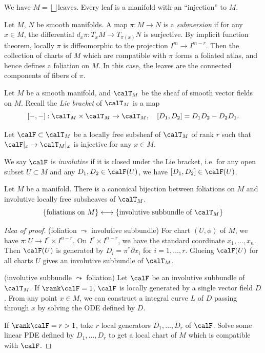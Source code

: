 \begin{remark}
  We have
  $M = \bigsqcup \text{leaves}$.
  Every leaf is a manifold with an ``injection'' to $M$.
\end{remark}

\begin{example}
  Let $M$, $N$ be smooth manifolds.
  A map $\pi : M \to N$ is a \emph{submersion} if for any $x \in M$, the differential $d_x \pi : T_x M \to T_{\pi(x)} N$ is surjective.
  By implicit function theorem, locally $\pi$ is diffeomorphic to the projection $I^m \to I^{m-r}$.
  Then the collection of charts of $M$ which are compatible with $\pi$ forms a foliated atlas, and hence defines a foliation on $M$.
  In this case, the leaves are the connected components of fibers of $\pi$.
\end{example}

Let $M$ be a smooth manifold, and $\calT_M$ be the sheaf of smooth vector fields on $M$.
Recall the \emph{Lie bracket} of $\calT_M$ is a map
\[ [ - , - ] : \calT_M \times \calT_M \to \calT_M, \quad [D_1, D_2] = D_1 D_2 - D_2 D_1. \]

Let $\calF \subset \calT_M$ be a locally free subsheaf of $\calT_M$ of rank $r$ such that $\calF|_x \to \calT_M|_x$ is injective for any $x \in M$.

\begin{definition}
  We say $\calF$ is \emph{involutive} if it is closed under the Lie bracket, i.e. for any open subset $U \subset M$ and any $D_1, D_2 \in \calF(U)$, we have $[D_1, D_2] \in \calF(U)$.
\end{definition}

\begin{theorem}[Frobenius]\label{thm:Frobenius}
  Let $M$ be a manifold.
  There is a canonical bijection between foliations on $M$ and involutive locally free subsheaves of $\calT_M$.
  \[ \{\text{foliations on } M\} \longleftrightarrow \{\text{involutive subbundle of } \calT_M\} \]
\end{theorem}
\begin{proof}[Idea of proof]

  (foliation $\leadsto$ involutive subbundle)
  For chart $(U , \phi)$ of $M$, we have $\pi : U \to I^r \times I^{n-r}$.
  On $I^r \times I^{n-r}$, we have the standard coordinate $x_1, ..., x_n$.
  Then $\calF(U)$ is generated by $D_i = \pi^*  \partial x_i$ for $i = 1, ..., r$.
  Glueing $\calF(U)$ for all charts $U$ gives an involutive subbundle of $\calT_M$.

  (involutive subbundle $\leadsto$ foliation)
  Let $\calF$ be an involutive subbundle of $\calT_M$.
  If $ \rank \calF = 1$, $\calF$ is locally generated by a single vector field $D$.
  From any point $x \in M$, we can construct a integral curve $L$ of $D$ passing through $x$ by solving the ODE defined by $D$.

  If $\rank \calF = r > 1$, take $r$ local generators $D_1, ..., D_r$ of $\calF$.
  Solve some linear PDE defined by $D_1, ..., D_r$ to get a local chart of $M$ which is compatible with $\calF$.
\end{proof}

